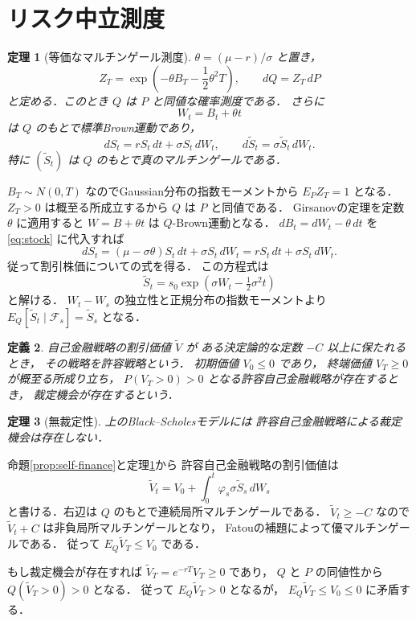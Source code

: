 \documentclass[a5paper,10pt,onecolumn]{jsarticle}
\makeatletter
\theoremstyle{mathnotetheorem}
\newtheorem{theorem}{定理}[section]
\newtheorem{definition}[theorem]{定義}
\renewcommand{\proofname}{証明}
\renewenvironment{proof}[1][\proofname]{%
  \par\pushQED{\qed}\normalfont\topsep4\p@\@plus2\p@\relax
  \trivlist\item[\hskip\labelsep\bfseries #1]\ignorespaces
}{\popQED\endtrivlist\@endpefalse}
\makeatother
\begin{document}
\section{リスク中立測度}

\begin{theorem}[等価なマルチンゲール測度]\label{thm:emm}
$\theta=(\mu-r)/\sigma$ と置き，
\[
 Z_T=\exp\!\left(-\theta B_T-\frac12\theta^2T\right),
 \qquad dQ=Z_T\,dP
\]
と定める．このとき $Q$ は $P$ と同値な確率測度である．
さらに
\[
 W_t=B_t+\theta t
\]
は $Q$ のもとで標準Brown運動であり，
\[
 dS_t=rS_t\,dt+\sigma S_t\,dW_t,\qquad
 d\widetilde S_t=\sigma\widetilde S_t\,dW_t.
\]
特に $(\widetilde S_t)$ は $Q$ のもとで真のマルチンゲールである．
\end{theorem}
\begin{proof}
$B_T\sim N(0,T)$ なのでGaussian分布の指数モーメントから
$E_PZ_T=1$ となる．$Z_T>0$ は概至る所成立するから
$Q$ は $P$ と同値である．
Girsanovの定理を定数 $\theta$ に適用すると
$W=B+\theta t$ は $Q$-Brown運動となる．
$dB_t=dW_t-\theta\,dt$ を \eqref{eq:stock} に代入すれば
\[
 dS_t=(\mu-\sigma\theta)S_t\,dt+\sigma S_t\,dW_t
 =rS_t\,dt+\sigma S_t\,dW_t.
\]
従って割引株価についての式を得る．
この方程式は
\[
 \widetilde S_t=s_0
 \exp\!\left(\sigma W_t-\tfrac12\sigma^2t\right)
\]
と解ける．
$W_t-W_s$ の独立性と正規分布の指数モーメントより
$E_Q[\widetilde S_t\mid\mathcal F_s]
=\widetilde S_s$ となる．
\end{proof}

\begin{definition}
自己金融戦略の割引価値 $\widetilde V$ が
ある決定論的な定数 $-C$ 以上に保たれるとき，
その戦略を\emph{許容戦略}という．
初期価値 $V_0\le0$ であり，
終端価値 $V_T\ge0$ が概至る所成り立ち，
$P(V_T>0)>0$ となる許容自己金融戦略が存在するとき，
裁定機会が存在するという．
\end{definition}

\begin{theorem}[無裁定性]\label{thm:no-arb}
上のBlack--Scholesモデルには
許容自己金融戦略による裁定機会は存在しない．
\end{theorem}
\begin{proof}
命題\ref{prop:self-finance}と定理\ref{thm:emm}から
許容自己金融戦略の割引価値は
\[
 \widetilde V_t
 =V_0+\int_0^t\varphi_s\sigma\widetilde S_s\,dW_s
\]
と書ける．右辺は $Q$ のもとで連続局所マルチンゲールである．
$\widetilde V_t\ge-C$ なので
$\widetilde V_t+C$ は非負局所マルチンゲールとなり，
Fatouの補題によって優マルチンゲールである．
従って $E_Q\widetilde V_T\le V_0$ である．

もし裁定機会が存在すれば
$\widetilde V_T=e^{-rT}V_T\ge0$ であり，
$Q$ と $P$ の同値性から
$Q(\widetilde V_T>0)>0$ となる．
従って $E_Q\widetilde V_T>0$ となるが，
$E_Q\widetilde V_T\le V_0\le0$ に矛盾する．
\end{proof}
\end{document}
